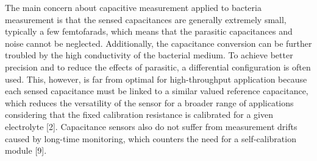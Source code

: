 The main concern about capacitive measurement applied to bacteria measurement is that the sensed capacitances are generally extremely small, typically a few femtofarads, which means that the parasitic capacitances and noise cannot be neglected. Additionally, the capacitance conversion can be further troubled by the high conductivity of the bacterial medium. To achieve better precision and to reduce the effects of parasitic, a differential configuration is often used. This, however, is far from optimal for high-throughput application because each sensed capacitance must be linked to a similar valued reference capacitance, which reduces the versatility of the sensor for a broader range of applications considering that the fixed calibration resistance is calibrated for a given electrolyte [2]. Capacitance sensors also do not suffer from measurement drifts caused by long-time monitoring, which counters the need for a self-calibration module [9].\par
